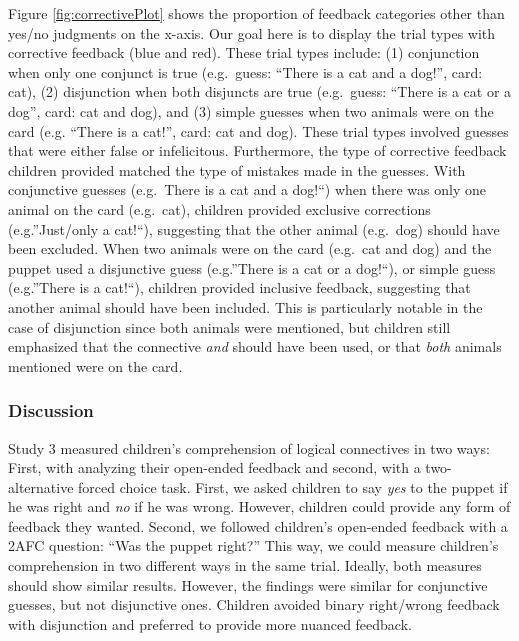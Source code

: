 \documentclass[floatsintext,man]{apa6}
\theoremstyle{definition}
\theoremstyle{definition}
\theoremstyle{definition}
\theoremstyle{remark}
\begin{document}
Figure \ref{fig:correctivePlot} shows the proportion of feedback
categories other than yes/no judgments on the x-axis. Our goal here is
to display the trial types with corrective feedback (blue and red).
These trial types include: (1) conjunction when only one conjunct is
true (e.g.~guess: \enquote{There is a cat and a dog!}, card: cat), (2)
disjunction when both disjuncts are true (e.g.~guess: \enquote{There is
a cat or a dog}, card: cat and dog), and (3) simple guesses when two
animals were on the card (e.g. \enquote{There is a cat!}, card: cat and
dog). These trial types involved guesses that were either false or
infelicitous. Furthermore, the type of corrective feedback children
provided matched the type of mistakes made in the guesses. With
conjunctive guesses (e.g.~There is a cat and a dog!\enquote{) when there
was only one animal on the card (e.g.~cat), children provided exclusive
corrections (e.g.}Just/only a cat!\enquote{), suggesting that the other
animal (e.g.~dog) should have been excluded. When two animals were on
the card (e.g.~cat and dog) and the puppet used a disjunctive guess
(e.g.}There is a cat or a dog!\enquote{), or simple guess (e.g.}There is
a cat!``), children provided inclusive feedback, suggesting that another
animal should have been included. This is particularly notable in the
case of disjunction since both animals were mentioned, but children
still emphasized that the connective \emph{and} should have been used,
or that \emph{both} animals mentioned were on the card.

\subsubsection{Discussion}\label{discussion-2}

Study 3 measured children's comprehension of logical connectives in two
ways: First, with analyzing their open-ended feedback and second, with a
two-alternative forced choice task. First, we asked children to say
\emph{yes} to the puppet if he was right and \emph{no} if he was wrong.
However, children could provide any form of feedback they wanted.
Second, we followed children's open-ended feedback with a 2AFC question:
\enquote{Was the puppet right?} This way, we could measure children's
comprehension in two different ways in the same trial. Ideally, both
measures should show similar results. However, the findings were similar
for conjunctive guesses, but not disjunctive ones. Children avoided
binary right/wrong feedback with disjunction and preferred to provide
more nuanced feedback.
\end{document}
